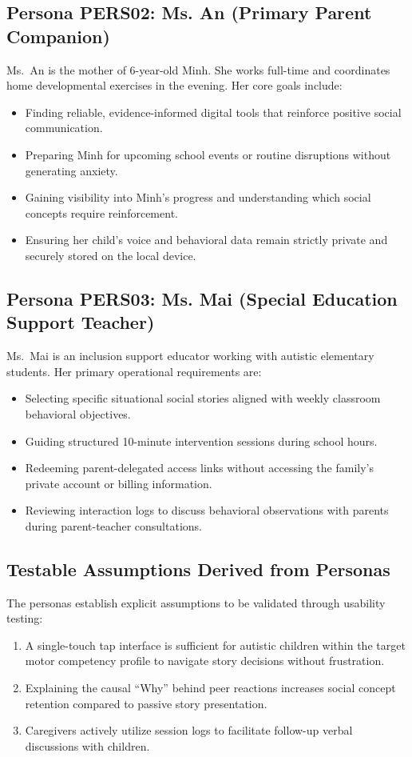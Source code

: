\subsection{Persona PERS02: Ms. An (Primary Parent Companion)}

Ms.~An is the mother of 6-year-old Minh. She works full-time and coordinates home developmental exercises in the evening. Her core goals include:
\begin{itemize}
    \item Finding reliable, evidence-informed digital tools that reinforce positive social communication.
    \item Preparing Minh for upcoming school events or routine disruptions without generating anxiety.
    \item Gaining visibility into Minh's progress and understanding which social concepts require reinforcement.
    \item Ensuring her child's voice and behavioral data remain strictly private and securely stored on the local device.
\end{itemize}

\subsection{Persona PERS03: Ms. Mai (Special Education Support Teacher)}

Ms.~Mai is an inclusion support educator working with autistic elementary students. Her primary operational requirements are:
\begin{itemize}
    \item Selecting specific situational social stories aligned with weekly classroom behavioral objectives.
    \item Guiding structured 10-minute intervention sessions during school hours.
    \item Redeeming parent-delegated access links without accessing the family's private account or billing information.
    \item Reviewing interaction logs to discuss behavioral observations with parents during parent-teacher consultations.
\end{itemize}

\subsection{Testable Assumptions Derived from Personas}

The personas establish explicit assumptions to be validated through usability testing:
\begin{enumerate}
    \item A single-touch tap interface is sufficient for autistic children within the target motor competency profile to navigate story decisions without frustration.
    \item Explaining the causal ``Why'' behind peer reactions increases social concept retention compared to passive story presentation.
    \item Caregivers actively utilize session logs to facilitate follow-up verbal discussions with children.
\end{enumerate}

